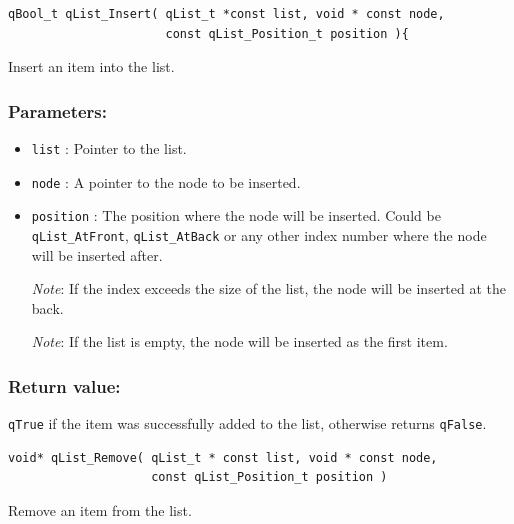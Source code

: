 \documentclass{article}
\begin{document}
\noindent\hrulefill

\begin{lstlisting}[style=CStyle]
qBool_t qList_Insert( qList_t *const list, void * const node, 
                      const qList_Position_t position ){
\end{lstlisting}

Insert an item into the list. 

\subsubsection*{Parameters:}
\begin{itemize}
    \item \lstinline{list} : Pointer to the list. 
    \item \lstinline{node} : A pointer to the node to be inserted.
    \item \lstinline{position} : The position where the node will be inserted. Could be \lstinline{qList_AtFront}, \lstinline{qList_AtBack} or any other index number where the node will be inserted after.
    
    \textit{Note}: If the index exceeds the size of the list, the node will be inserted at the back.
    
    \textit{Note}: If the list is empty, the node will be inserted as the first item.
\end{itemize}

\subsubsection*{Return value:}
\lstinline{qTrue} if the item was successfully added to the list, otherwise returns \lstinline{qFalse}. 

\noindent\hrulefill

\begin{lstlisting}[style=CStyle]
void* qList_Remove( qList_t * const list, void * const node, 
                    const qList_Position_t position )
\end{lstlisting}

Remove an item from the list. 
\end{document}
